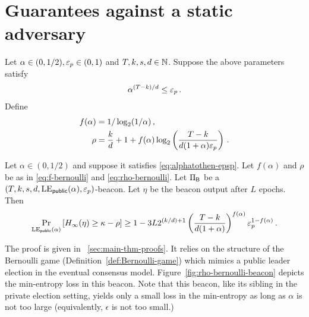 




%   





\section{Guarantees against a static adversary}


Let $\alpha \in (0, 1/2), \mathsf{\varepsilon}_p \in (0, 1)$ and $T, k, s, d \in \mathbb{N}$.
Suppose the above parameters satisfy 
\begin{align}\label{eq:alphatothen-epsp}
  \alpha^{(T-k)/d} \leq \mathsf{\varepsilon}_p
  \,.
\end{align}
Define 
\begin{align}
  f(\alpha)&= 1/\log_2(1/\alpha)\,, \label{eq:f-bernoulli} \\
  \rho &= \frac{k}{d} + 1 + f(\alpha) \log_2 \left(\frac{T-k}{d (1+\alpha) \mathsf{\varepsilon}_p } \right)
  \,. \label{eq:rho-bernoulli}
\end{align}

\begin{theorem}\label{thm:beacon-bernoulli-multi-epoch}
  Let $\alpha \in (0, 1/2)$ and suppose it satisfies \eqref{eq:alphatothen-epsp}.
  Let $f(\alpha)$ and $\rho$ be as in \eqref{eq:f-bernoulli} and \eqref{eq:rho-bernoulli}.
  Let $\Pi_{\mathsf{B}}$ be a $(T,k,s,d,\mathrm{LE}_\mathsf{public}(\alpha), \mathsf{\varepsilon}_p)$-beacon.
  Let $\eta$ be the beacon output after $L$ epochs. 
  Then 
  \begin{equation}\label{eq:security-bernoulli-multi-epoch}
    \Pr_{\mathrm{LE}_\mathsf{public}(\alpha)}\left[H_\infty(\eta) \geq \kappa - \rho \right] 
      \geq 1 - 3 L
        2^{(k/d) + 1}
        \left( \frac{T-k}{d(1+\alpha)}\right)^{f(\alpha)}
        \mathsf{\varepsilon}_p^{1-f(\alpha)}
    \,.
  \end{equation}
\end{theorem}
The proof is given in \Section~\ref{sec:main-thm-proofs}. 
It relies on the structure of the Bernoulli game (Definition~\ref{def:Bernoulli-game}) 
which mimics a public leader election in the eventual consensus model. 
Figure~\ref{fig:rho-bernoulli-beacon} depicts the min-entropy loss in this beacon. 
Note that this beacon, like its sibling in the private election setting, 
yields only a small loss in the min-entropy as long as $\alpha$ is not too large 
(equivalently, $\epsilon$ is not too small.)


